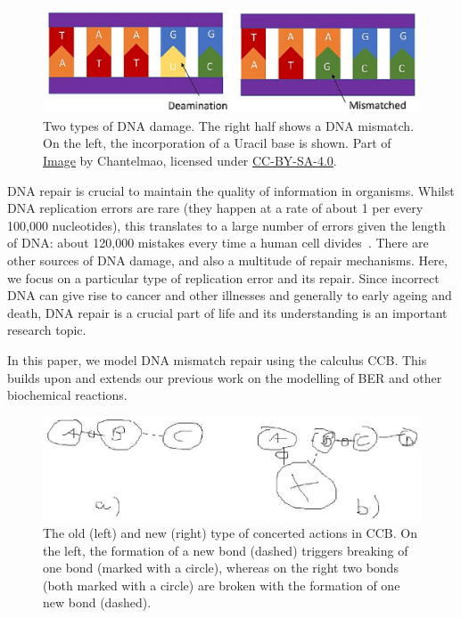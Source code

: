 \documentclass[review]{elsarticle}
\begin{document}
\begin{figure}[h!]
  \centering
    \includegraphics[width=1.0\textwidth]{Types_of_DNA_Damage_part}
  \caption[Two types of DNA damage.]{Two types of DNA damage. The right half shows a DNA mismatch.
  On the left, the incorporation of a Uracil base is shown.
  Part of \href{https://commons.wikimedia.org/wiki/File:Types_of_DNA_Damage.jpg}{Image} by Chantelmao, licensed under \href{https://creativecommons.org/licenses/by-sa/4.0/deed.en}{CC-BY-SA-4.0}.}
  \label{fig:damages}
\end{figure}

DNA repair is crucial to maintain the quality of information in organisms. Whilst DNA replication errors are rare (they happen at a rate of about 1 per every 100,000 nucleotides), this translates to a large number of errors given the length of DNA: about 120,000 mistakes every time a human cell divides~\cite{damage}. There are other sources of DNA damage, and also a multitude of repair mechanisms. Here, we focus on a particular type of replication error and its repair. Since incorrect DNA can give rise to cancer and other illnesses and generally to early ageing and death, DNA repair is a crucial part of life and its understanding is an important research topic.

In this paper, we model DNA mismatch repair using the calculus CCB. This builds upon and extends our previous work on the modelling of BER and other biochemical reactions.

\begin{figure}[h!]
  \centering
    \includegraphics[width=1.0\textwidth]{introexample.ps}
  \caption{The old (left) and new (right) type of concerted actions in CCB. On the left, the formation of a new bond (dashed) triggers breaking of one bond (marked with a circle), whereas on the right two bonds (both marked with a circle) are broken with the formation of one new bond (dashed).}
  \label{fig:introexample}
\end{figure}
\end{document}
